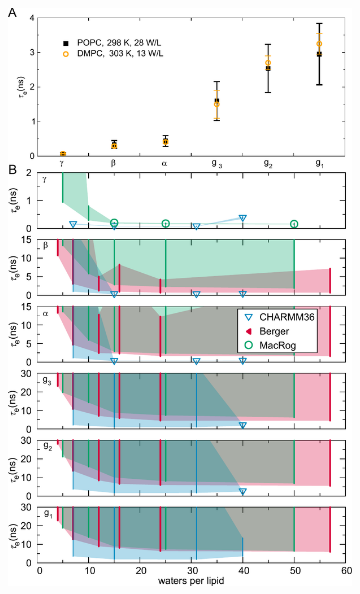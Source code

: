 \documentclass[journal=jcisd8,manuscript=article,layout=twocolumn]{achemso}
\begin{document}
\begin{figure}[h!]
\begin{figure}[ht!]
\centering
\includegraphics[width=\columnwidth]{../Figs/hydration_2020.pdf} 


\end{figure}
\end{figure}
\end{document}

